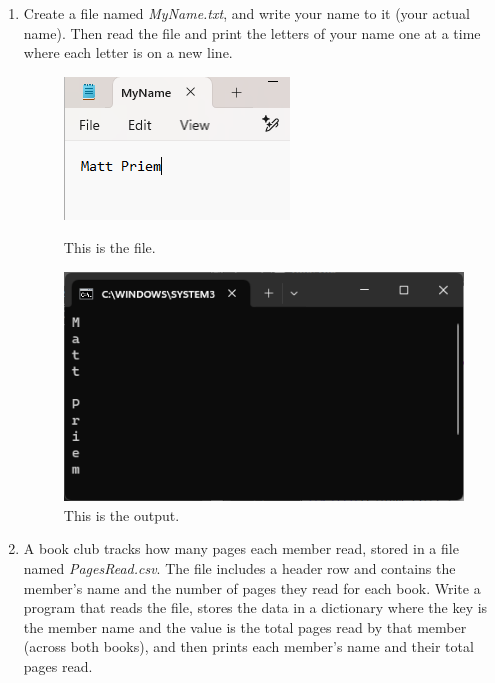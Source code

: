 \documentclass{article}
\begin{document}
\begin{enumerate}
	\item
		Create a file named \textit{MyName.txt}, and write your name to it (your actual name).	 
		Then read the file and print the letters of your name one at a time where each letter is on a new line.
		\begin{figure}[ht]
			\centering
			\begin{minipage}[b]{.4\textwidth}
				\centering
				\includegraphics[scale=1]{imgs/nameFile.png}
				\caption{This is the file.}	
			\end{minipage}
			\hspace*{2em}
			\begin{minipage}[b]{.4\textwidth}
				\centering
				\includegraphics[width=1\textwidth]{imgs/nameOutput.png}
				\caption{This is the output.}
			\end{minipage}
		\end{figure}


	\item 
		A book club tracks how many pages each member read, stored in a file named 
		\textit{PagesRead.csv}. The file includes a header row and contains the member's 
		name and the number of pages they read for each book.  
		Write a program that reads the file, stores the data in a dictionary where the key is 
		the member name and the value is the total pages read by that member (across both books), 
		and then prints each member's name and their total pages read.
		

\end{enumerate}
\end{document}
